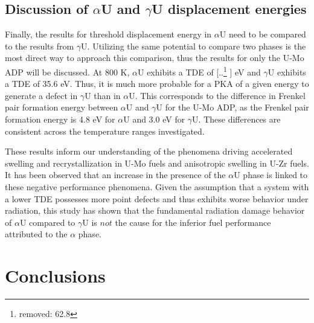 \documentclass[review]{elsarticle}
\providecommand{\DIFaddtex}[1]{{\protect\color{blue} \sf #1}} %
\providecommand{\DIFdeltex}[1]{{\protect\color{red} [..\footnote{removed: #1} ]}} %
\providecommand{\DIFaddbegin}{} %
\providecommand{\DIFaddend}{} %
\providecommand{\DIFdelbegin}{} %
\providecommand{\DIFdelend}{} %
\providecommand{\DIFadd}[1]{\texorpdfstring{\DIFaddtex{#1}}{#1}} %
\providecommand{\DIFdel}[1]{\texorpdfstring{\DIFdeltex{#1}}{}} %
\newcommand{\DIFscaledelfig}{0.5}
\newlength{\DIFdelgraphicswidth} %
\newlength{\DIFdelgraphicsheight} %
\newcommand{\DIFaddincludegraphics}[2][]{{\color{blue}\fbox{\DIFOincludegraphics[#1]{#2}}}} %
\newcommand{\DIFdelincludegraphics}[2][]{%
\sbox{\DIFdelgraphicsbox}{\DIFOincludegraphics[#1]{#2}}%
\settoboxwidth{\DIFdelgraphicswidth}{\DIFdelgraphicsbox} %
\settoboxtotalheight{\DIFdelgraphicsheight}{\DIFdelgraphicsbox} %
\scalebox{\DIFscaledelfig}{%
\parbox[b]{\DIFdelgraphicswidth}{\usebox{\DIFdelgraphicsbox}\\[-\baselineskip] \rule{\DIFdelgraphicswidth}{0em}}\llap{\resizebox{\DIFdelgraphicswidth}{\DIFdelgraphicsheight}{%
\setlength{\unitlength}{\DIFdelgraphicswidth}%
\begin{picture}(1,1)%
\thicklines\linethickness{2pt} %
{\color[rgb]{1,0,0}\put(0,0){\framebox(1,1){}}}%
{\color[rgb]{1,0,0}\put(0,0){\line( 1,1){1}}}%
{\color[rgb]{1,0,0}\put(0,1){\line(1,-1){1}}}%
\end{picture}%
}\hspace*{3pt}}} %
} %
\DeclareRobustCommand{\DIFaddbegin}{\DIFOaddbegin \let\includegraphics\DIFaddincludegraphics} %
\DeclareRobustCommand{\DIFaddend}{\DIFOaddend \let\includegraphics\DIFOincludegraphics} %
\DeclareRobustCommand{\DIFdelbegin}{\DIFOdelbegin \let\includegraphics\DIFdelincludegraphics} %
\DeclareRobustCommand{\DIFdelend}{\DIFOaddend \let\includegraphics\DIFOincludegraphics} %
\begin{document}
\subsection{Discussion of $\alpha$U and $\gamma$U displacement energies}

Finally, the results for threshold displacement energy in $\alpha$U need to be compared to the results from $\gamma$U. Utilizing the same potential to compare two phases is the most direct way to approach this comparison, thus the results for only the U-Mo ADP will be discussed. At 800 K, $\alpha$U exhibits a TDE of \DIFdelbegin \DIFdel{62.8 }\DIFdelend \DIFaddbegin \DIFadd{63.4 }\DIFaddend eV and $\gamma$U exhibits a TDE of 35.6 eV. Thus, it is much more probable for a PKA of a given energy to generate a defect in $\gamma$U than in $\alpha$U. This corresponds to the difference in Frenkel pair formation energy between $\alpha$U and $\gamma$U for the U-Mo ADP, as the Frenkel pair formation energy is 4.8 eV for $\alpha$U and 3.0 eV for $\gamma$U. These differences are consistent across the temperature ranges investigated.

These results inform our understanding of the phenomena driving accelerated swelling and recrystallization in U-Mo fuels and anisotropic swelling in U-Zr fuels. It has been observed that an increase in the presence of the $\alpha$U phase is linked to these negative performance phenomena. Given the assumption that a system with a lower TDE possesses more point defects and thus exhibits worse behavior under radiation, this study has shown that the fundamental radiation damage behavior of $\alpha$U compared to $\gamma$U is $\textit{not}$ the cause for the inferior fuel performance attributed to the $\alpha$ phase.

\FloatBarrier

\section{Conclusions}
\end{document}
